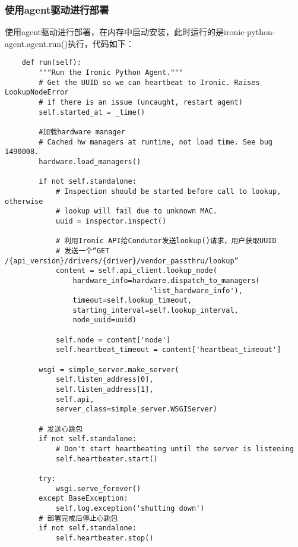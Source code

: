 \documentclass[a4paper,left=2.5cm,right=2.5cm,11pt]{article}
\begin{document}
\subsubsection{使用agent驱动进行部署}
	使用agent驱动进行部署，在内存中启动安装，此时运行的是ironic-python-agent.agent.run()执行，代码如下：
	\begin{lstlisting}
	def run(self):
        """Run the Ironic Python Agent."""
        # Get the UUID so we can heartbeat to Ironic. Raises LookupNodeError
        # if there is an issue (uncaught, restart agent)
        self.started_at = _time()

        #加载hardware manager
        # Cached hw managers at runtime, not load time. See bug 1490008.
        hardware.load_managers()

        if not self.standalone:
            # Inspection should be started before call to lookup, otherwise
            # lookup will fail due to unknown MAC.
            uuid = inspector.inspect()

            # 利用Ironic API给Condutor发送lookup()请求，用户获取UUID
			# 发送一个“GET /{api_version}/drivers/{driver}/vendor_passthru/lookup”
            content = self.api_client.lookup_node(
                hardware_info=hardware.dispatch_to_managers(
                                  'list_hardware_info'),
                timeout=self.lookup_timeout,
                starting_interval=self.lookup_interval,
                node_uuid=uuid)

            self.node = content['node']
            self.heartbeat_timeout = content['heartbeat_timeout']

        wsgi = simple_server.make_server(
            self.listen_address[0],
            self.listen_address[1],
            self.api,
            server_class=simple_server.WSGIServer)

        # 发送心跳包
        if not self.standalone:
            # Don't start heartbeating until the server is listening          
            self.heartbeater.start()

        try:
            wsgi.serve_forever()
        except BaseException:
            self.log.exception('shutting down')
        # 部署完成后停止心跳包
        if not self.standalone:
            self.heartbeater.stop()
	\end{lstlisting}
\end{document}
